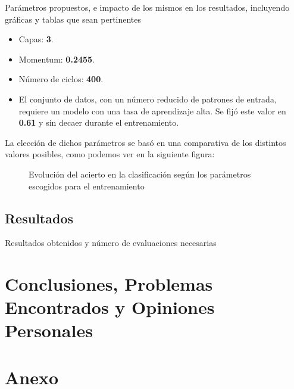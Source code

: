 \documentclass[12pt]{article}
\begin{document}
Parámetros propuestos, e impacto de los mismos en los 
resultados, incluyendo 
gráficas y 
tablas que sean pertinentes

\begin{itemize}
    \setlength\itemsep{0em}
    \item Capas: \textbf{3}.
    \item Momentum: \textbf{0.2455}.
    \item Número de ciclos: \textbf{400}.
    \item El conjunto de datos, con un número reducido de patrones de
    entrada, requiere un modelo con una tasa de aprendizaje alta. Se fijó este
    valor en \textbf{0.61} y sin decaer durante el entrenamiento.
\end{itemize}

La elección de dichos parámetros se basó en una comparativa de los distintos
valores posibles, como podemos ver en la siguiente figura:

\begin{figure}[h]
    \center
    \caption{Evolución del acierto en la clasificación según los parámetros escogidos para el entrenamiento}
    \label{}
\end{figure}

\subsection{Resultados}

Resultados obtenidos y 
número de evaluaciones
necesarias


\newpage


\newpage

\section{Conclusiones, Problemas Encontrados y Opiniones Personales}

\section{Anexo}



\end{document}
